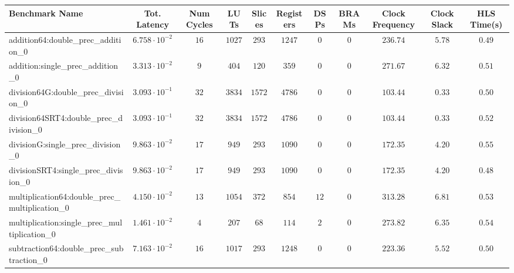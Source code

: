 \begin{tabular}{|l|c|c|c|c|c|c|c|c|c|c|}
\hline
Benchmark Name                                   & Tot. Latency            & Num Cycles & LUTs      & Slices   & Registers & DSPs   & BRAMs & Clock Frequency & Clock Slack & HLS Time(s) \\
\hline
addition64:double\_prec\_addition\_0             & $ 6.758 \cdot 10^{-2} $ & $ 16     $ & $ 1027  $ & $ 293  $ & $ 1247  $ & $ 0  $ & $ 0 $ & $ 236.74      $ & $ 5.78    $ & $ 0.49    $ \\
addition:single\_prec\_addition\_0               & $ 3.313 \cdot 10^{-2} $ & $ 9      $ & $ 404   $ & $ 120  $ & $ 359   $ & $ 0  $ & $ 0 $ & $ 271.67      $ & $ 6.32    $ & $ 0.51    $ \\
division64G:double\_prec\_division\_0            & $ 3.093 \cdot 10^{-1} $ & $ 32     $ & $ 3834  $ & $ 1572 $ & $ 4786  $ & $ 0  $ & $ 0 $ & $ 103.44      $ & $ 0.33    $ & $ 0.50    $ \\
division64SRT4:double\_prec\_division\_0         & $ 3.093 \cdot 10^{-1} $ & $ 32     $ & $ 3834  $ & $ 1572 $ & $ 4786  $ & $ 0  $ & $ 0 $ & $ 103.44      $ & $ 0.33    $ & $ 0.52    $ \\
divisionG:single\_prec\_division\_0              & $ 9.863 \cdot 10^{-2} $ & $ 17     $ & $ 949   $ & $ 293  $ & $ 1090  $ & $ 0  $ & $ 0 $ & $ 172.35      $ & $ 4.20    $ & $ 0.55    $ \\
divisionSRT4:single\_prec\_division\_0           & $ 9.863 \cdot 10^{-2} $ & $ 17     $ & $ 949   $ & $ 293  $ & $ 1090  $ & $ 0  $ & $ 0 $ & $ 172.35      $ & $ 4.20    $ & $ 0.48    $ \\
multiplication64:double\_prec\_multiplication\_0 & $ 4.150 \cdot 10^{-2} $ & $ 13     $ & $ 1054  $ & $ 372  $ & $ 854   $ & $ 12 $ & $ 0 $ & $ 313.28      $ & $ 6.81    $ & $ 0.53    $ \\
multiplication:single\_prec\_multiplication\_0   & $ 1.461 \cdot 10^{-2} $ & $ 4      $ & $ 207   $ & $ 68   $ & $ 114   $ & $ 2  $ & $ 0 $ & $ 273.82      $ & $ 6.35    $ & $ 0.54    $ \\
subtraction64:double\_prec\_subtraction\_0       & $ 7.163 \cdot 10^{-2} $ & $ 16     $ & $ 1017  $ & $ 293  $ & $ 1248  $ & $ 0  $ & $ 0 $ & $ 223.36      $ & $ 5.52    $ & $ 0.50    $ \\

\end{tabular}
